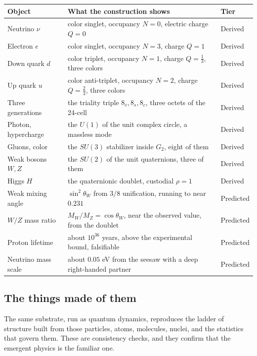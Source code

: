 \begin{center}
\renewcommand{\arraystretch}{1.25}
\begin{tabular}{p{} p{} p{}}
  \toprule
  \textbf{Object} & \textbf{What the construction shows} & \textbf{Tier} \\
  \midrule
  Neutrino $\nu$        & color singlet, occupancy $N=0$, electric charge $Q=0$ & Derived \\
  Electron $e$          & color singlet, occupancy $N=3$, charge $Q=1$ & Derived \\
  Down quark $d$        & color triplet, occupancy $N=1$, charge $Q=\tfrac13$, three colors & Derived \\
  Up quark $u$          & color anti-triplet, occupancy $N=2$, charge $Q=\tfrac23$, three colors & Derived \\
  Three generations     & the triality triple $8_v, 8_s, 8_c$, three octets of the 24-cell & Derived \\
  Photon, hypercharge   & the $U(1)$ of the unit complex circle, a massless mode & Derived \\
  Gluons, color         & the $SU(3)$ stabilizer inside $G_2$, eight of them & Derived \\
  Weak bosons $W, Z$    & the $SU(2)$ of the unit quaternions, three of them & Derived \\
  Higgs $H$             & the quaternionic doublet, custodial $\rho = 1$ & Derived \\
  Weak mixing angle     & $\sin^2\theta_W$ from $3/8$ unification, running to near $0.231$ & Predicted \\
  $W/Z$ mass ratio      & $M_W / M_Z = \cos\theta_W$, near the observed value, from the doublet & Predicted \\
  Proton lifetime       & about $10^{36}$ years, above the experimental bound, falsifiable & Predicted \\
  Neutrino mass scale   & about $0.05$ eV from the seesaw with a deep right-handed partner & Predicted \\
  \bottomrule
\end{tabular}
\end{center}

\subsection{The things made of them}

The same substrate, run as quantum dynamics, reproduces the ladder of structure built from those particles, atoms,
molecules, nuclei, and the statistics that govern them. These are consistency checks, and they confirm that the
emergent physics is the familiar one.

